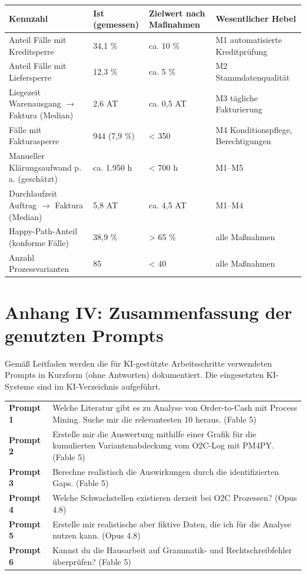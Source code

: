 \begin{table}[!htb]
\centering
\small
\begin{tabularx}{\textwidth}{@{}Y l l Y@{}}
\toprule
\textbf{Kennzahl} & \textbf{Ist (gemessen)} & \textbf{Zielwert nach Maßnahmen} & \textbf{Wesentlicher Hebel} \\
\midrule
Anteil Fälle mit Kreditsperre & 34,1 \% & ca. 10 \% & M1 automatisierte Kreditprüfung \\
Anteil Fälle mit Liefersperre & 12,3 \% & ca. 5 \% & M2 Stammdatenqualität \\
Liegezeit Warenausgang $\rightarrow$ Faktura (Median) & 2,6 AT & ca. 0,5 AT & M3 tägliche Fakturierung \\
Fälle mit Fakturasperre & 944 (7,9 \%) & \textless{} 350 & M4 Konditionspflege, Berechtigungen \\
Manueller Klärungsaufwand p. a. (geschätzt) & ca. 1.950 h & \textless{} 700 h & M1--M5 \\
Durchlaufzeit Auftrag $\rightarrow$ Faktura (Median) & 5,8 AT & ca. 4,5 AT & M1--M4 \\
Happy-Path-Anteil (konforme Fälle) & 38,9 \% & \textgreater{} 65 \% & alle Maßnahmen \\
Anzahl Prozessvarianten & 85 & \textless{} 40 & alle Maßnahmen \\
\bottomrule
\end{tabularx}
\end{table}
\clearpage

\label{anh:prompts}
\section*{Anhang IV: Zusammenfassung der genutzten Prompts}

Gemäß Leitfaden werden die für KI-gestützte Arbeitsschritte verwendeten Prompts in Kurzform (ohne Antworten) dokumentiert. Die eingesetzten KI-Systeme sind im KI-Verzeichnis aufgeführt.

{\small
\renewcommand{\arraystretch}{1.35}
\begin{longtable}{@{}p{}p{}@{}}
\textbf{Prompt 1} &
Welche Literatur gibt es zu Analyse von Order-to-Cash mit Process Mining. Suche mir die relevantesten 10 heraus. (Fable 5)
\\[1.2em]
\textbf{Prompt 2} &
Erstelle mir die Auswertung mithilfe einer Grafik für die kumulierten Variantenabdeckung vom O2C-Log mit PM4PY. (Fable 5)
\\[1.2em]
\textbf{Prompt 3} &
Berechne realistisch die Auswirkungen durch die identifizierten Gaps. (Fable 5)
\\[1.2em]
\textbf{Prompt 4} &
Welche Schwachstellen existieren derzeit bei O2C Prozessen? (Opus 4.8)
\\[1.2em]
\textbf{Prompt 5} &
Erstelle mir realistische aber fiktive Daten, die ich für die Analyse nutzen kann. (Opus 4.8)
\\[1.2em]
\textbf{Prompt 6} &
Kannst du die Hausarbeit auf Grammatik- und Rechtschreibfehler überprüfen? (Fable 5)
\\[1.2em]
\end{longtable}}